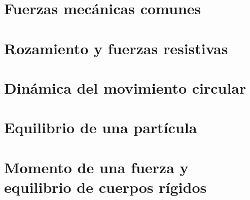 ﻿\documentclass[11pt,letterpaper,openany]{book}
\newcommand{\rutaraiz}{../..}
\begin{document}

\chapter{Fuerzas mecánicas comunes}





\chapter{Rozamiento y fuerzas resistivas}





\chapter{Dinámica del movimiento circular}





\chapter{Equilibrio de una partícula}





\chapter{Momento de una fuerza y equilibrio de cuerpos rígidos}
\end{document}
